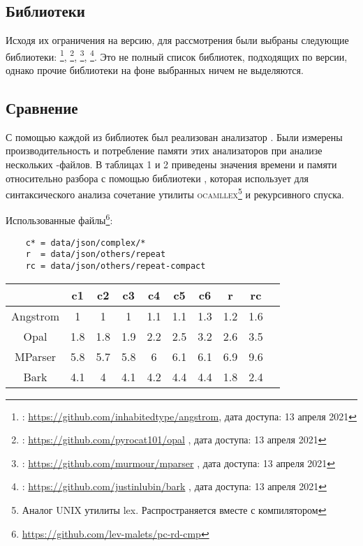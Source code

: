 \subsection{Библиотеки}

Исходя их ограничения на версию, для рассмотрения были выбраны следующие библиотеки:
\angstrom \footnote{\angstrom : \url{https://github.com/inhabitedtype/angstrom}, дата доступа: 13 апреля 2021},
\opal     \footnote{\opal     : \url{https://github.com/pyrocat101/opal}       , дата доступа: 13 апреля 2021},
\mparser  \footnote{\mparser  : \url{https://github.com/murmour/mparser}       , дата доступа: 13 апреля 2021},
\bark     \footnote{\bark     : \url{https://github.com/justinlubin/bark}      , дата доступа: 13 апреля 2021}.
Это не полный список библиотек, подходящих по версии, однако прочие библиотеки на фоне выбранных ничем не выделяются.

\subsection{Сравнение}

С помощью каждой из библиотек был реализован анализатор \json{}.
Были измерены производительность и потребление памяти этих анализаторов при анализе нескольких \json-файлов.
В таблицах 1 и 2 приведены значения времени и памяти относительно разбора с помощью библиотеки \yojson{},
которая использует для синтаксического анализа \json{} сочетание утилиты
\textsc{ocamllex}\footnote{Аналог \textsc{UNIX} утилиты lex. Распространяется вместе с компилятором \ocaml} и рекурсивного спуска.

\noindent
Использованные файлы\footnote{\url{https://github.com/lev-malets/pc-rd-cmp}}:
\begin{lstlisting}
    c* = data/json/complex/*
    r  = data/json/others/repeat
    rc = data/json/others/repeat-compact
\end{lstlisting}

\noindent
\begin{center}
    \begin{tabular}{|c|c|c|c|c|c|c|c|c|c|}
        \hline
                        & c1  & c2  & c3  & c4  & c5  & c6  & r   & rc    \\\hline
        Angstrom        & 1   & 1   & 1   & 1.1 & 1.1 & 1.3 & 1.2 & 1.6   \\
        Opal            & 1.8 & 1.8 & 1.9 & 2.2 & 2.5 & 3.2 & 2.6 & 3.5   \\
        MParser         & 5.8 & 5.7 & 5.8 & 6   & 6.1 & 6.1 & 6.9 & 9.6   \\
        Bark            & 4.1 & 4   & 4.1 & 4.2 & 4.4 & 4.4 & 1.8 & 2.4   \\\hline
    \end{tabular}
\end{center}


